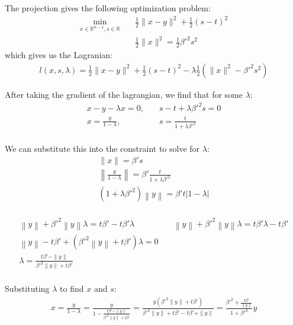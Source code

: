 \documentclass{article}
\theoremstyle{case}
\begin{document}
The projection gives the following optimization problem:
\begin{align*}
\min_{x \in \mathbb R^{n-1}, s \in \mathbb R} & \quad \frac 1 2 \|x - y\|^2 + \frac 1 2 (s - t)^2 \\
			& \quad \frac 1 2 \|x\|^2 = \frac 1 2 {\beta'}^2 s^2
\end{align*}
which gives us the Lagranian:
\begin{align*}
l(x, s, \lambda) = \frac 1 2 \|x - y \|^2 + \frac 1 2 \left(s - t\right)^2 - \lambda \frac 1 2 \left(\|x\|^2 - {\beta'}^2 s^2\right)
\end{align*}

After taking the gradient of the lagrangian, we find that for some $\lambda$:
\begin{align*}
x - y - \lambda x = 0, & \quad s - t + \lambda {\beta'}^2 s = 0 \\
x = \frac {y}{1 - \lambda}, & \quad s = \frac {t}{1 + \lambda {\beta'}^2 } \\
\end{align*}

We can substitute this into the constraint to solve for $\lambda$:
\begin{align*}
\|x\| = {\beta'} s \\
\left\|\frac {y}{1 - \lambda}\right\| = {\beta'} \frac {t}{1 + \lambda {\beta'}^2 } \\
\left(1 + \lambda {\beta'}^2\right) \left\|y\right\| = {\beta'}  {t} \left|1 - \lambda\right|\\
\end{align*}

\begin{align*}
\left\|y\right\| + {\beta'}^2\left\|y\right\|\lambda = t {\beta'} - t {\beta'} \lambda          &   \quad
\left\|y\right\| + {\beta'}^2\left\|y\right\|\lambda = t {\beta'} \lambda - t {\beta'}					\\
\left\|y\right\|-t {\beta'} +\left( {\beta'}^2\left\|y\right\| + t {\beta'} \right)\lambda = 0  &		\\
\lambda = \frac{t {\beta'} - \|y\|}{{\beta'}^2\|y\| + t {\beta'}}                               &		\\
\end{align*}


Substituting $\lambda$ to find $x$ and $s$:
\begin{align*}
x = \frac {y}{1 - \lambda} 																		
= \frac {y}{1 - \frac{t{\beta'} - \|y\|}{{\beta'}^2\|y\| + t{\beta'}}} 									
= \frac {y\left({\beta'}^2\|y\| + t{\beta'}\right)}{{\beta'}^2\|y\| + t{\beta'} - t{\beta'} + \|y\|} 			
= \frac {{\beta'}^2 + \frac{t{\beta'}}{\|y\|}}{1 + {\beta'}^2}y 											
\end{align*}
\end{document}

